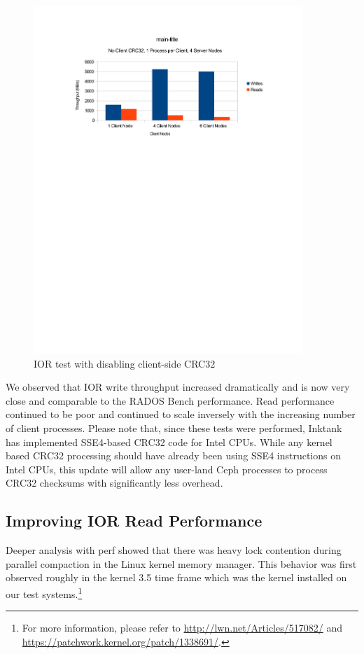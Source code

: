 \documentclass{article}
\begin{document}
\begin{figure}[htb]
\centering
\includegraphics[width=4in]{ior-client-no-crc32}
\caption{IOR test with disabling client-side CRC32}
\label{fig:ior-no-client-crc32}
\end{figure}

We observed that IOR write throughput increased dramatically and is now very
close and comparable to the RADOS Bench performance. Read performance continued
to be poor and continued to scale inversely with the increasing number of
client processes.  Please note that, since these tests were performed, Inktank
has implemented SSE4-based CRC32 code for Intel CPUs.  While any kernel based
CRC32 processing should have already been using SSE4 instructions on Intel
CPUs, this update will allow any user-land Ceph processes to process CRC32
checksums with significantly less overhead.

\subsection{Improving IOR Read Performance}

Deeper analysis with perf showed that there was heavy lock contention during
parallel compaction in the Linux kernel memory manager.  This behavior was first
observed roughly in the kernel 3.5 time frame which was the kernel
installed on our test systems.\footnote{For more information,
please refer to \url{http://lwn.net/Articles/517082/} and
\url{https://patchwork.kernel.org/patch/1338691/}.}
\end{document}
